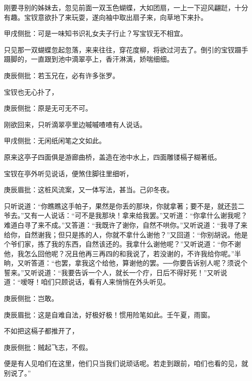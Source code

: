 \begin{parag}
    刚要寻别的姊妹去，忽见前面一双玉色蝴蝶，大如团扇，一上一下迎风翩跹，十分有趣。宝钗意欲扑了来玩耍，遂向袖中取出扇子来，向草地下来扑。\begin{note}甲戌侧批：可是一味知书识礼女夫子行止？写宝钗无不相宜。\end{note}只见那一双蝴蝶忽起忽落，来来往往，穿花度柳，将欲过河去了。倒引的宝钗蹑手蹑脚的，一直跟到池中滴翠亭上，香汗淋漓，娇喘细细。\begin{note}庚辰侧批：若玉兄在，必有许多张罗。\end{note}宝钗也无心扑了，\begin{note}庚辰侧批：原是无可无不可。\end{note}刚欲回来，只听滴翠亭里边嘁嘁喳喳有人说话。\begin{note}甲戌侧批：无闲纸闲笔之文如此。\end{note}原来这亭子四面俱是游廊曲桥，盖造在池中水上，四面雕镂槅子糊著纸。
\end{parag}


\begin{parag}
    宝钗在亭外听见说话，便煞住脚往里细听，\begin{note}庚辰眉批：这桩风流案，又一体写法，甚当。己卯冬夜。\end{note}只听说道：“你瞧瞧这手帕子，果然是你丢的那块，你就拿著；要不是，就还芸二爷去。”又有一人说话：“可不是我那块！拿来给我罢。”又听道：“你拿什么谢我呢？难道白寻了来不成。”又答道：“我既许了谢你，自然不哄你。”又听说道：“我寻了来给你，自然谢我；但只是拣的人，你就不拿什么谢他？”又回道：“你别胡说。他是个爷们家，拣了我的东西，自然该还的。我拿什么谢他呢？”又听说道：“你不谢他，我怎么回他呢？况且他再三再四的和我说了，若没谢的，不许我给你呢。”半晌，又听答道：“也罢，拿我这个给他，算谢他的罢。──你要告诉别人呢？须说个誓来。”又听说道：“我要告诉一个人，就长一个疔，日后不得好死！”又听说道：“嗳呀！咱们只顾说话，看有人来悄悄在外头听见。\begin{note}庚辰侧批：岂敢。\end{note}\begin{note}庚辰眉批：这是自难自法，好极好极！惯用险笔如此。壬午夏，雨窗。\end{note}不如把这槅子都推开了，\begin{note}庚辰侧批：贼起飞志，不假。\end{note}便是有人见咱们在这里，他们只当我们说顽话呢。若走到跟前，咱们也看的见，就别说了。”
\end{parag}


